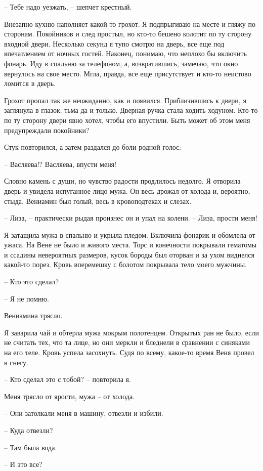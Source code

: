 \documentclass[
]{book}
\begin{document}
-- Тебе надо уезжать, -- шепчет крестный.

Внезапно кухню наполняет какой-то грохот. Я подпрыгиваю на месте и гляжу по сторонам. Покойников и след простыл, но кто-то бешено колотит по ту сторону входной двери. Несколько секунд я тупо смотрю на дверь, все еще под впечатлением от ночных гостей. Наконец, понимаю, что неплохо бы включить фонарь. Иду в спальню за телефоном, а, возвратившись, замечаю, что окно вернулось на свое место. Мгла, правда, все еще присутствует и кто-то неистово ломится в дверь.

Грохот пропал так же неожиданно, как и появился. Приблизившись к двери, я заглянула в глазок: тьма да и только. Дверная ручка стала ходить ходуном. Кто-то по ту сторону двери явно хотел, чтобы его впустили. Быть может об этом меня предупреждали покойники?

Стук повторился, а затем раздался до боли родной голос:

-- Васляева!? Васляева, впусти меня!

Словно камень с души, но чувство радости продлилось недолго. Я отворила дверь и увидела испуганное лицо мужа. Он весь дрожал от холода и, вероятно, стыда. Вениамин был голый, весь в кровоподтеках и слезах.

-- Лиза, -- практически рыдая произнес он и упал на колени. -- Лиза, прости меня!

Я затащила мужа в спальню и укрыла пледом. Включила фонарик и обомлела от ужаса. На Вене не было и живого места. Торс и конечности покрывали гематомы и ссадины невероятных размеров, кусок бороды был оторван и за ухом виднелся какой-то порез. Кровь вперемешку с болотом покрывала тело моего мужчины.

-- Кто это сделал?

-- Я не помню.

Вениамина трясло.

Я заварила чай и обтерла мужа мокрым полотенцем. Открытых ран не было, если не считать тех, что та лице, но они меркли и бледнели в сравнении с синяками на его теле. Кровь успела засохнуть. Судя по всему, какое-то время Веня провел в снегу.

-- Кто сделал это с тобой? -- повторила я.

Меня трясло от ярости, мужа -- от холода.

-- Они затолкали меня в машину, отвезли и избили.

-- Куда отвезли?

-- Там была вода.

-- И это все?
\end{document}
